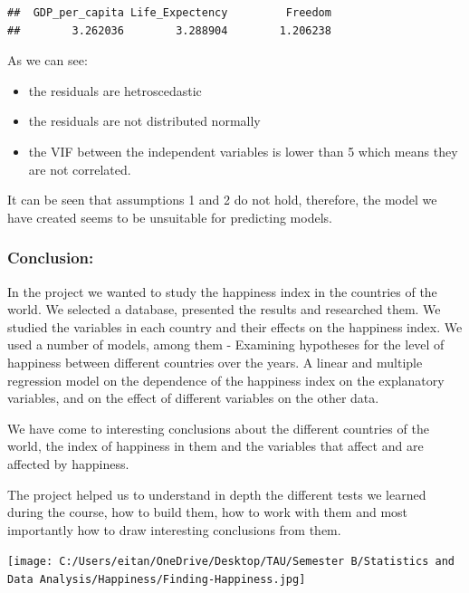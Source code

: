 \documentclass[
]{article}
\providecommand{\tightlist}{%
  \setlength{\itemsep}{0pt}\setlength{\parskip}{0pt}}
\begin{document}
\begin{verbatim}
##  GDP_per_capita Life_Expectency         Freedom 
##        3.262036        3.288904        1.206238
\end{verbatim}

\hfill\break

As we can see:

\begin{itemize}
\tightlist
\item
  the residuals are hetroscedastic\\
\item
  the residuals are not distributed normally\\
\item
  the VIF between the independent variables is lower than 5 which means
  they are not correlated.\\
\end{itemize}

It can be seen that assumptions 1 and 2 do not hold, therefore, the
model we have created seems to be unsuitable for predicting models.\\

\hypertarget{conclusion-1}{%
\subsubsection{Conclusion:}\label{conclusion-1}}

In the project we wanted to study the happiness index in the countries
of the world. We selected a database, presented the results and
researched them. We studied the variables in each country and their
effects on the happiness index. We used a number of models, among them -
Examining hypotheses for the level of happiness between different
countries over the years. A linear and multiple regression model on the
dependence of the happiness index on the explanatory variables, and on
the effect of different variables on the other data.

We have come to interesting conclusions about the different countries of
the world, the index of happiness in them and the variables that affect
and are affected by happiness.

The project helped us to understand in depth the different tests we
learned during the course, how to build them, how to work with them and
most importantly how to draw interesting conclusions from them.

\hfill\break
\hfill\break

\texttt{[image: C:/Users/eitan/OneDrive/Desktop/TAU/Semester B/Statistics and Data Analysis/Happiness/Finding-Happiness.jpg]}
\end{document}
